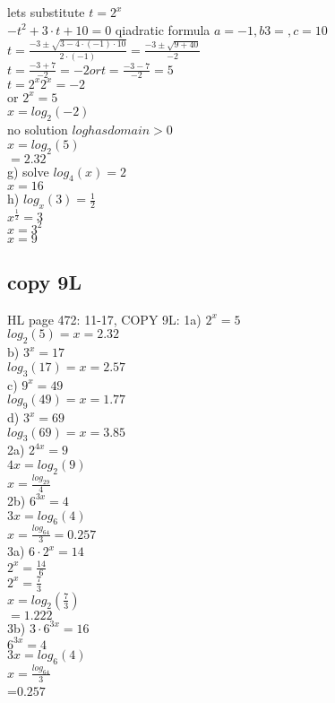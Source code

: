 \documentclass{article}
\begin{document}
  lets substitute $t=2^x$\\
  $-t^2+3\cdot t+10=0$ qiadratic formula $a=-1,b3=,c=10$\\
  $t=\frac{-3\pm\sqrt{3-4\cdot(-1)\cdot10}}{2\cdot(-1)}=\frac{-3\pm\sqrt{9+40}}{-2}$\\
  $t=\frac{-3+7}{-2}=-2 or t=\frac{-3-7}{-2}=5$\\
  $t=2^x 2^x=-2$\\
  or $2^x=5$\\
  $x=log_2(-2)$\\
  no solution $log has domain >0$\\
  $x=log_2(5)$\\
  $=2.32$\\
  g) solve $log_4(x)=2$\\
  $x=16$\\
  h) $log_x(3)=\frac{1}{2}$\\
  $x^{\frac{1}{2}}=3$\\
  $x=3^2$\\
  $x=9$\\
  \subsection{copy 9L}
  HL page 472: 11-17,
  COPY 9L:
  1a) $2^x=5$\\
  $log_2(5)=x=2.32$\\
  b) $3^x=17$\\
  $log_3(17)=x=2.57$\\
  c) $9^x=49$\\
  $log_9(49)=x=1.77$\\
  d) $3^x=69$\\
  $log_3(69)=x=3.85$\\
  2a) $2^{4x}=9$\\
  $4x=log_2(9)$\\
  $x=\frac{log_29}{4}$\\
  2b) $6^{3x}=4$\\
  $3x=log_6(4)$\\
  $x=\frac{log_64}{3}=0.257$\\
  3a) $6\cdot 2^x=14$\\
  $2^x=\frac{14}{6}$\\
  $2^x=\frac{7}{3}$\\
  $x=log_2(\frac{7}{3})$\\
  $=1.222$\\
  3b) $3\cdot 6^{3x}=16$\\
  $6^{3x}=4$\\
  $3x=log_6(4)$\\
  $x=\frac{log_64}{3}$\\
  =$0.257$\\

  
  
\end{document}
